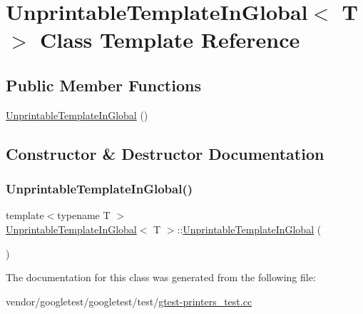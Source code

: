 \hypertarget{class_unprintable_template_in_global}{}\section{Unprintable\+Template\+In\+Global$<$ T $>$ Class Template Reference}
\label{class_unprintable_template_in_global}
\subsection*{Public Member Functions}
\begin{DoxyCompactItemize}
\item 
\hyperlink{class_unprintable_template_in_global_a50fb82625ee9f5cceadf42f8b0f15bf7}{Unprintable\+Template\+In\+Global} ()
\end{DoxyCompactItemize}


\subsection{Constructor \& Destructor Documentation}
\mbox{\label{class_unprintable_template_in_global_a50fb82625ee9f5cceadf42f8b0f15bf7}} 
\subsubsection{\texorpdfstring{Unprintable\+Template\+In\+Global()}{UnprintableTemplateInGlobal()}}
{\footnotesize\ttfamily template$<$typename T $>$ \\
\hyperlink{class_unprintable_template_in_global}{Unprintable\+Template\+In\+Global}$<$ T $>$\+::\hyperlink{class_unprintable_template_in_global}{Unprintable\+Template\+In\+Global} (\begin{DoxyParamCaption}{ }\end{DoxyParamCaption})\hspace{0.3cm}{\ttfamily [inline]}}



The documentation for this class was generated from the following file\+:\begin{DoxyCompactItemize}
\item 
vendor/googletest/googletest/test/\hyperlink{gtest-printers__test_8cc}{gtest-\/printers\+\_\+test.\+cc}\end{DoxyCompactItemize}
